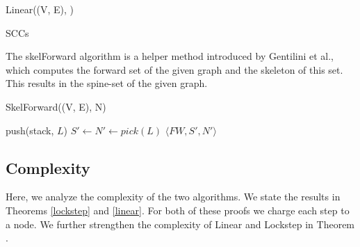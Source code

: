 \documentclass[../master/master.tex]{subfiles}
\begin{document}
\begin{algorithm}[H]
  \caption{Linear((V, E), )}
  \begin{algorithmic}[1]
     \State \Return
    \EndIf
    \Statex
    \EndIf
    \Statex
    \Statex
    \EndWhile
    \Statex
    \Statex
    \Statex
    \State \Return SCCs
  \end{algorithmic}
\end{algorithm}

The skelForward algorithm is a helper method introduced by Gentilini et al., which computes the forward set of the given graph and the skeleton of this set. This results in the spine-set of the given graph.

\begin{algorithm}[H]
  \caption{SkelForward((V, E), N)}
  \begin{algorithmic}[1]
    \Statex
    \State push(stack, $L$)
    \EndWhile
    \Statex
    \State $S' \gets N' \gets pick(L)$
    \EndWhile
    \Statex
    \State \Return $\langle FW, S', N' \rangle$
  \end{algorithmic}
\end{algorithm}
\subsection{Complexity}
Here, we analyze the complexity of the two algorithms. We state the results in Theorems \ref{lockstep} and \ref{linear}. For both of these proofs we charge each step to a node. We further strengthen the complexity of Linear and Lockstep in Theorem \label{magic}.
\end{document}
